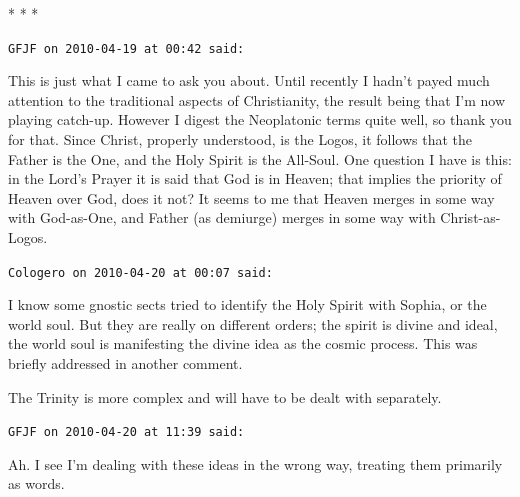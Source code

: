 
\begin{center}* * *\end{center}

\begin{footnotesize}
\begin{sffamily}
\texttt{GFJF on 2010-04-19 at 00:42 said:}

This is just what I came to ask you about. Until recently I hadn't payed much attention to the traditional aspects of Christianity, the result being that I'm now playing catch-up. However I digest the Neoplatonic terms quite well, so thank you for that. Since Christ, properly understood, is the Logos, it follows that the Father is the One, and the Holy Spirit is the All-Soul. One question I have is this: in the Lord's Prayer it is said that God is in Heaven; that implies the priority of Heaven over God, does it not? It seems to me that Heaven merges in some way with God-as-One, and Father (as demiurge) merges in some way with Christ-as-Logos.

\hfill

\texttt{Cologero on 2010-04-20 at 00:07 said:}

I know some gnostic sects tried to identify the Holy Spirit with Sophia, or the world soul. But they are really on different orders; the spirit is divine and ideal, the world soul is manifesting the divine idea as the cosmic process. This was briefly addressed in another comment.

The Trinity is more complex and will have to be dealt with separately.

\hfill

\texttt{GFJF on 2010-04-20 at 11:39 said:}

Ah. I see I'm dealing with these ideas in the wrong way, treating them primarily as words.

\end{sffamily}
\end{footnotesize}

